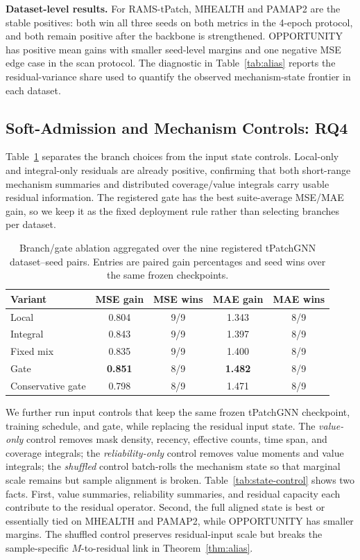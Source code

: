 ﻿\documentclass[10pt,conference]{IEEEtran}
\newcommand{\tpatchinst}{\textnormal{\mbox{RAMS-tPatch}}}
\newcommand{\baseT}{\textnormal{\mbox{tPatchGNN}}}
\begin{document}
\textbf{Dataset-level results.}
For \tpatchinst{}, MHEALTH and PAMAP2 are the stable positives: both win all
three seeds on both metrics in the 4-epoch protocol, and both remain positive
after the backbone is strengthened.  OPPORTUNITY has positive mean gains with smaller seed-level
margins and one negative MSE edge case in the scan protocol.  The diagnostic in
Table~\ref{tab:alias} reports the residual-variance share used to quantify the
observed mechanism-state frontier in each dataset.

\subsection{Soft-Admission and Mechanism Controls: RQ4}

Table~\ref{tab:branch-ablation} separates the branch choices from the input
state controls.  Local-only and integral-only residuals are already positive,
confirming that both short-range mechanism summaries and distributed
coverage/value integrals carry usable residual information.  The registered
gate has the best suite-average MSE/MAE gain, so we keep it as the fixed
deployment rule rather than selecting branches per dataset.

\begin{table}[H]
\centering
\caption{Branch/gate ablation aggregated over the nine registered
\baseT{} dataset--seed pairs.  Entries are paired gain percentages and seed
wins over the same frozen checkpoints.}
\label{tab:branch-ablation}
\footnotesize
\begin{tabular}{lcccc}
\toprule
Variant & MSE gain & MSE wins & MAE gain & MAE wins \\
\midrule
Local & 0.804 & 9/9 & 1.343 & 8/9 \\
Integral & 0.843 & 9/9 & 1.397 & 8/9 \\
Fixed mix & 0.835 & 9/9 & 1.400 & 8/9 \\
Gate & \textbf{0.851} & 8/9 & \textbf{1.482} & 8/9 \\
Conservative gate & 0.798 & 8/9 & 1.471 & 8/9 \\
\bottomrule
\end{tabular}
\end{table}

We further run input controls that keep the same frozen \baseT{} checkpoint,
training schedule, and gate, while replacing the residual input state.  The
\emph{value-only} control removes mask density, recency, effective counts, time
span, and coverage integrals; the \emph{reliability-only} control removes
value moments and value integrals; the \emph{shuffled} control batch-rolls the
mechanism state so that marginal scale remains but sample alignment is broken.
Table~\ref{tab:state-control} shows two facts.  First, value summaries,
reliability summaries, and residual capacity each contribute to the residual
operator.  Second, the full aligned state is best or essentially tied on MHEALTH
and PAMAP2, while OPPORTUNITY has smaller margins.  The shuffled control
preserves residual-input scale but breaks the sample-specific
\(M\)-to-residual link in Theorem~\ref{thm:alias}.
\end{document}
